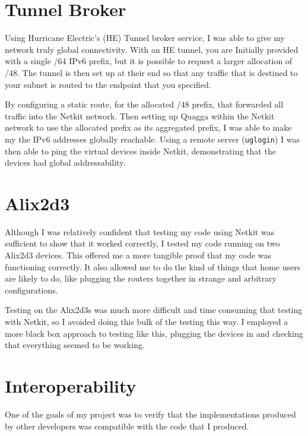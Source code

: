 \documentclass[12pt]{report}
\begin{document}

\section{Tunnel Broker}
Using Hurricane Electric's (HE) Tunnel broker service, I was able to give my
network truly global connectivity. With an HE tunnel, you are Initially
provided with a single /64 IPv6 prefix, but it is possible to request a larger
allocation of /48. The tunnel is then set up at their end so that any traffic
that is destined to your subnet is routed to the endpoint that you specified.  

By configuring a static route, for the allocated /48 prefix, that forwarded all
traffic into the Netkit network. Then setting up Quagga within the Netkit
network to use the allocated prefix as its aggregated prefix, I was able to
make my the IPv6 addresses globally reachable. Using a remote server
(\texttt{uglogin}) I was then able to ping the virtual devices inside Netkit,
demonstrating that the devices had global addressability.

\section{Alix2d3}
Although I was relatively confident that testing my code using Netkit was
sufficient to show that it worked correctly, I tested my code running on two
Alix2d3 devices. This offered me a more tangible proof that my code was
functioning correctly. It also allowed me to do the kind of things that home users
are likely to do, like plugging the routers together in strange and arbitrary
configurations.

Testing on the Alix2d3s was much more difficult and time consuming that testing
with Netkit, so I avoided doing this bulk of the testing this way. I employed a
more black box approach to testing like this, plugging the devices in and
checking that everything seemed to be working. 

\section{Interoperability}
One of the goals of my project was to verify that the implementations produced
by other developers was compatible with the code that I produced. 
\end{document}
